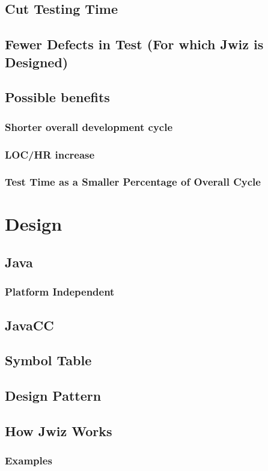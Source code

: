 \subsection{Cut Testing Time}
\subsection{Fewer Defects in Test (For which Jwiz is Designed)}
\subsection{Possible benefits}
\subsubsection{Shorter overall development cycle}
\subsubsection{LOC/HR increase}
\subsubsection{Test Time as a Smaller Percentage of Overall Cycle}

\section{Design}
\subsection{Java}
\subsubsection{Platform Independent}
\subsection{JavaCC}
\subsection{Symbol Table}
\subsection{Design Pattern}
\subsection{How Jwiz Works}
\subsubsection{Examples}
